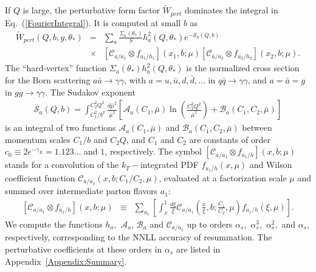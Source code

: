 \documentclass[12pt,english,aps,preprint,prd,letterpaper,fleqn,nofootinbib,showpacs,showkeys,tightenlines,floatfix]{revtex4}
\begin{document}
If $Q$ is large, the perturbative form factor $\widetilde{W}_{pert}$
dominates the integral in Eq.~(\ref{FourierIntegral}). It is computed
at small $b$ as \begin{eqnarray}
\widetilde{W}_{pert}(Q,b,y,\theta_{*}) & = & \sum_{a}\frac{\Sigma_{a}(\theta_{*})}{S}h_{a}^{2}(Q,\theta_{*})e^{-\mathcal{S}_{a}(Q,b)}\nonumber \\
 & \times & \left[\mathcal{C}_{a/a_{1}}\otimes f_{a_{1}/h_{1}}\right](x_{1},b;\mu)\left[\mathcal{C}_{\bar{a}/a_{2}}\otimes f_{a_{2}/h_{2}}\right](x_{2},b;\mu).\label{UnpW2}\end{eqnarray}
 The {}``hard-vertex'' function $\Sigma_{a}(\theta_{*})h_{a}^{2}(Q,\theta_{*})$
is the normalized cross section for the Born scattering $a\bar{a}\rightarrow\gamma\gamma$,
with $a=u,\bar{u},d,\bar{d},...$ in $q\bar{q}\rightarrow\gamma\gamma$,
and $a=\bar{a}=g$ in $gg\rightarrow\gamma\gamma$. The Sudakov exponent\begin{eqnarray}
\mathcal{S}_{a}(Q,b)=\int_{C_{1}^{2}/b^{2}}^{C_{2}^{2}Q^{2}}\frac{d\bar{\mu}^{2}}{\bar{\mu}^{2}}\left[\mathcal{A}_{a}\left(C_{1},\bar{\mu}\right)\ln\left(\frac{C_{2}^{2}Q^{2}}{\bar{\mu}^{2}}\right)+\mathcal{B}_{a}\left(C_{1},C_{2},\bar{\mu}\right)\right]\label{Sudakov}\end{eqnarray}
 is an integral of two functions $\mathcal{A}_{a}\left(C_{1},\bar{\mu}\right)$
and $\mathcal{B}_{a}\left(C_{1},C_{2},\bar{\mu}\right)$ between momentum
scales $C_{1}/b$ and $C_{2}Q$, and $C_{1}$ and $C_{2}$ are constants
of order $c_{0}\equiv2e^{-\gamma_{E}}=1.123...$ and $1$, respectively.
The symbol $\left[\mathcal{C}_{a/a_{1}}\otimes f_{a_{1}/h}\right](x,b;\mu)$
stands for a convolution of the $k_{T}-$integrated PDF
$f_{a_{1}/h}(x,\mu)$ and Wilson coefficient function $\mathcal{C}_{a/a_{1}}(x,b;C_{1}/C_{2},\mu)$,
evaluated at a factorization scale $\mu$ and summed over intermediate
parton flavors $a_{1}$: \begin{eqnarray}
\left[\mathcal{C}_{a/a_{1}}\otimes f_{a_{1}/h}\right](x,b;\mu) & \equiv & \sum_{a_{1}}\left[\int_{x}^{1}{\frac{d\xi}{\xi}}\mathcal{C}_{a/a_{1}}\left(\frac{x}{\xi},b;\frac{C_{1}}{C_{2}},\mu\right)f_{a_{1}/h}(\xi,\mu)\right].\label{Eq:CalP}\end{eqnarray}
 We compute the functions $h_{a},$ $\mathcal{A}_{a}$, $\mathcal{B}_{a}$
and $\mathcal{C}_{a/a_{1}}$ up to orders $\alpha_{s},$ $\alpha_{s}^{3},$
$\alpha_{s}^{2},$ and $\alpha_{s},$ respectively, corresponding
to the NNLL accuracy of resummation. The perturbative coefficients
at these orders in $\alpha_{s}$ are listed in Appendix~\ref{Appendix:Summary}.
\end{document}
